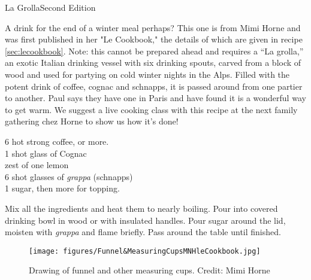 \begin{entry}{La Grolla}{Second Edition}

\begin{open}
 A drink for the end of a winter meal perhaps? This one is from Mimi Horne and was first published in her "Le Cookbook," the details of which are given in recipe \ref{sec:lecookbook}. Note: this cannot be prepared ahead and requires a ``La grolla,'' an exotic Italian drinking vessel with six drinking spouts, carved from a block of wood and used for partying on cold winter nights in the Alps. Filled with the potent drink of coffee, cognac and schnapps, it is passed around from one partier to another. Paul says they have one in Paris and have found it is a wonderful way to get warm. We suggest a live cooking class with this recipe at the next family gathering chez Horne to show us how it's done!

\end{open}
\begin{ingredients}
  \SI{6}{\cup} hot strong coffee, or more. \\
  1 shot glass of Cognac \\
  zest of one lemon \\
  6 shot glasses of \emph{grappa} (schnapps) \\
  \SI{1}{\cup} sugar, then more for topping.
\end{ingredients}
Mix all the ingredients and heat them to nearly boiling. Pour into covered drinking bowl in wood or with insulated handles. Pour sugar around the lid, moisten with \emph{grappa} and flame briefly. Pass around the table until finished.
\begin{figure}[h]
    \centering
    \texttt{[image: figures/Funnel\&MeasuringCupsMNHleCookbook.jpg]}
    \caption{Drawing of funnel and other measuring cups. Credit: Mimi Horne}
    \label{fig:mimi_funnel}
\end{figure}


\end{entry}


